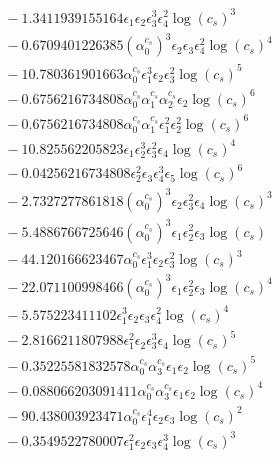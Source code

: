\documentclass[10pt]{article}
\begin{document}
\begin{align*}
&{}  - 1.3411939155164 \epsilon_{1} \epsilon_{2} \epsilon_{3}^{3} \epsilon_{4}^{2} \log{\left(c_{s} \right)}^{3} \\
&{}  - 0.6709401226385 \left(\alpha_{0}^{c_s}\right)^{3} \epsilon_{2} \epsilon_{3} \epsilon_{4}^{2} \log{\left(c_{s} \right)}^{4} \\
&{}  - 10.780361901663 \alpha_{0}^{c_s} \epsilon_{1}^{3} \epsilon_{2} \epsilon_{3}^{2} \log{\left(c_{s} \right)}^{5} \\
&{}  - 0.6756216734808 \alpha_{0}^{c_s} \alpha_{1}^{c_s} \alpha_{2}^{c_s} \epsilon_{2} \log{\left(c_{s} \right)}^{6} \\
&{}  - 0.6756216734808 \alpha_{0}^{c_s} \alpha_{1}^{c_s} \epsilon_{1}^{2} \epsilon_{2}^{2} \log{\left(c_{s} \right)}^{6} \\
&{}  - 10.825562205823 \epsilon_{1} \epsilon_{2}^{3} \epsilon_{3}^{2} \epsilon_{4} \log{\left(c_{s} \right)}^{4} \\
&{}  - 0.04256216734808 \epsilon_{2}^{2} \epsilon_{3} \epsilon_{4}^{3} \epsilon_{5} \log{\left(c_{s} \right)}^{6} \\
&{}  - 2.7327277861818 \left(\alpha_{0}^{c_s}\right)^{3} \epsilon_{2} \epsilon_{3}^{2} \epsilon_{4} \log{\left(c_{s} \right)}^{3} \\
&{}  - 5.4886766725646 \left(\alpha_{0}^{c_s}\right)^{3} \epsilon_{1} \epsilon_{2}^{2} \epsilon_{3} \log{\left(c_{s} \right)} \\
&{}  - 44.120166623467 \alpha_{0}^{c_s} \epsilon_{1}^{3} \epsilon_{2} \epsilon_{3}^{2} \log{\left(c_{s} \right)}^{3} \\
&{}  - 22.071100998466 \left(\alpha_{0}^{c_s}\right)^{3} \epsilon_{1} \epsilon_{2}^{2} \epsilon_{3} \log{\left(c_{s} \right)}^{4} \\
&{}  - 5.575223411102 \epsilon_{1}^{3} \epsilon_{2} \epsilon_{3} \epsilon_{4}^{2} \log{\left(c_{s} \right)}^{4} \\
&{}  - 2.8166211807988 \epsilon_{1}^{2} \epsilon_{2} \epsilon_{3}^{3} \epsilon_{4} \log{\left(c_{s} \right)}^{5} \\
&{}  - 0.35225581832578 \alpha_{0}^{c_s} \alpha_{3}^{c_s} \epsilon_{1} \epsilon_{2} \log{\left(c_{s} \right)}^{5} \\
&{}  - 0.088066203091411 \alpha_{0}^{c_s} \alpha_{3}^{c_s} \epsilon_{1} \epsilon_{2} \log{\left(c_{s} \right)}^{4} \\
&{}  - 90.438003923471 \alpha_{0}^{c_s} \epsilon_{1}^{4} \epsilon_{2} \epsilon_{3} \log{\left(c_{s} \right)}^{2} \\
&{}  - 0.3549522780007 \epsilon_{1}^{2} \epsilon_{2} \epsilon_{3} \epsilon_{4}^{3} \log{\left(c_{s} \right)}^{3} \\

\end{align*}
\end{document}
